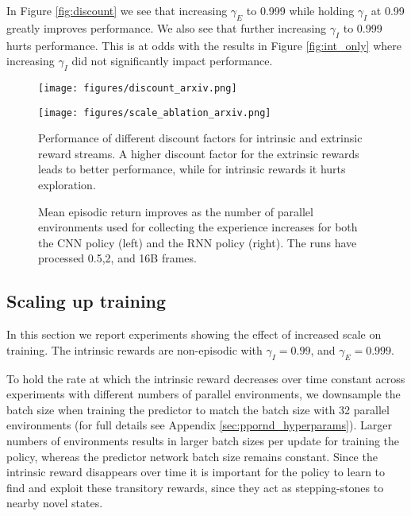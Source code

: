\documentclass{article} \usepackage[dvipsnames]{xcolor}
\begin{document}
In Figure \ref{fig:discount} we see that increasing $\gamma_E$ to 0.999 while holding $\gamma_I$ at 0.99 greatly improves performance. We also see that further increasing $\gamma_I$ to 0.999 hurts performance. This is at odds with the results in Figure \ref{fig:int_only} where increasing $\gamma_I$ did not significantly impact performance.
\begin{figure}[tbp]
\centering
\begin{minipage}[t]{0.48\linewidth}
\centering
\texttt{[image: figures/discount\_arxiv.png]}
\end{minipage}\hspace{.02\textwidth}
\begin{minipage}[t]{0.48\linewidth}
\centering
\texttt{[image: figures/scale\_ablation\_arxiv.png]}
\end{minipage}\par
\vspace*{-5pt}
\begin{minipage}[t]{0.48\linewidth}
\caption{Performance of different discount factors for intrinsic and extrinsic reward streams. A higher discount factor for the extrinsic rewards leads to better performance, while for intrinsic rewards it hurts exploration.}
\label{fig:discount}
\end{minipage}\hspace{.02\textwidth}
\begin{minipage}[t]{0.48\linewidth}
\caption{Mean episodic return improves as the number of parallel environments used for collecting the experience increases for both the CNN policy (left) and the RNN policy (right). The runs have processed 0.5,2, and 16B frames.}
\label{fig:scale}
\end{minipage}\vspace*{-20pt}
\end{figure}


\subsection{Scaling up training}
\label{sec:exp_scale}
In this section we report experiments showing the effect of increased scale on training. The intrinsic rewards are non-episodic with $\gamma_I =0.99$, and $\gamma_E = 0.999$.

To hold the rate at which the intrinsic reward decreases over time constant across experiments with different numbers of parallel environments, we downsample the batch size when training the predictor to match the batch size with 32 parallel environments (for full details see Appendix \ref{sec:ppornd_hyperparams}). Larger numbers of environments results in larger batch sizes per update for training the policy, whereas the predictor network batch size remains constant. Since the intrinsic reward disappears over time it is important for the policy to learn to find and exploit these transitory rewards, since they act as stepping-stones to nearby novel states.
\end{document}

